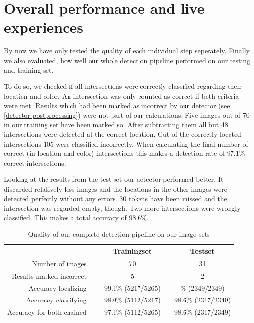 	\section{Overall performance and live experiences}
	\label{evaluation-overallPerformance}
	By now we have only tested the quality of each individual step seperately. Finally we also evaluated, how well our whole detection pipeline performed on our testing and training set.

	To do so, we checked if all intersections were correctly classified regarding their location and color. An intersection was only counted as correct if both criteria were met. Results which had been marked as incorrect by our detector (see \autoref{detector-postprocessing}) were not part of our calculations. Five images out of 70 in our training set have been marked so. After subtracting them all but 48 intersections were detected at the correct location. Out of the correctly located intersections 105 were classified incorrectly. When calculating the final number of correct (in location and color) intersections this makes a detection rate of 97.1\% correct intersections.

	Looking at the results from the test set our detector performed better. It discarded relatively less images and the locations in the other images were detected perfectly without any errors. 30 tokens have been missed and the intersection was regarded empty, though. Two more intersections were wrongly classified. This makes a total accuracy of 98.6\%.

	\newcommand*\leftlap[2]{\hphantom{#1}\llap{#2}}
	\newcommand*\rightlap[2]{\rlap{#2}\hphantom{#1}}
	\begin{table}
	\center
		\begin{tabular}{rlccc}
			  &\	 		 			& 	Trainingset 	 &\hphantom{Ab}& Testset 	\\
			\toprule
			Number of images			&&	70					 &&		31				\\
			Results marked incorrect 	&&	 5					 &&		 2				\\
			Accuracy localizing			&&	99.1\% (5217/5265)	 && \leftlap{98.6}{100}\% (2349/2349) \\
			Accuracy classifying		&&	98.0\% (5112/5217)	 && 98.6\% (2317/2349)	\\
			Accuracy for both chained	&&	97.1\% (5112/5265)	 && 98.6\% (2317/2349) 	\\
			\bottomrule
		\end{tabular}
		\caption{Quality of our complete detection pipeline on our image sets}
	\end{table}

